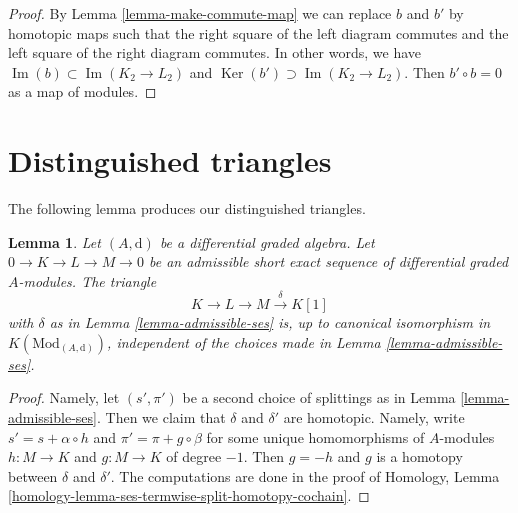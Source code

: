 \documentclass{stacks-project}
\theoremstyle{plain}
\newtheorem{lemma}[subsection]{Lemma}
\theoremstyle{definition}
\theoremstyle{remark}
\numberwithin{equation}{subsection}
\def\Ker{\mathop{\mathrm{Ker}}}
\def\Im{\mathop{\mathrm{Im}}}
\begin{document}
\begin{proof}
By Lemma \ref{lemma-make-commute-map} we can replace $b$ and $b'$ by
homotopic maps such that the right square of the left diagram commutes
and the left square of the right diagram commutes. In other words, we have
$\Im(b) \subset \Im(K_2 \to L_2)$ and
$\Ker(b') \supset \Im(K_2 \to L_2)$.
Then $b' \circ b = 0$ as a map of modules.
\end{proof}
















\section{Distinguished triangles}
\label{section-distinguished}

\noindent
The following lemma produces our distinguished triangles.

\begin{lemma}
\label{lemma-triangle-independent-splittings}
Let $(A, \text{d})$ be a differential graded algebra. Let
$0 \to K \to L \to M \to 0$ be an admissible short exact sequence
of differential graded $A$-modules. The triangle
\begin{equation}
\label{equation-triangle-associated-to-admissible-ses}
K \to L \to M \xrightarrow{\delta} K[1]
\end{equation}
with $\delta$ as in Lemma \ref{lemma-admissible-ses} is, up to canonical
isomorphism in $K(\text{Mod}_{(A, \text{d})})$, independent of the choices
made in Lemma \ref{lemma-admissible-ses}.
\end{lemma}

\begin{proof}
Namely, let $(s', \pi')$ be a second choice of splittings as in
Lemma \ref{lemma-admissible-ses}. Then we claim that $\delta$ and $\delta'$
are homotopic. Namely, write $s' = s + \alpha \circ h$ and
$\pi' = \pi + g \circ \beta$ for some unique homomorphisms
of $A$-modules $h : M \to K$ and $g : M \to K$ of degree $-1$.
Then $g = -h$ and $g$ is a homotopy between $\delta$ and $\delta'$.
The computations are done in the proof of
Homology, Lemma \ref{homology-lemma-ses-termwise-split-homotopy-cochain}.
\end{proof}
\end{document}
